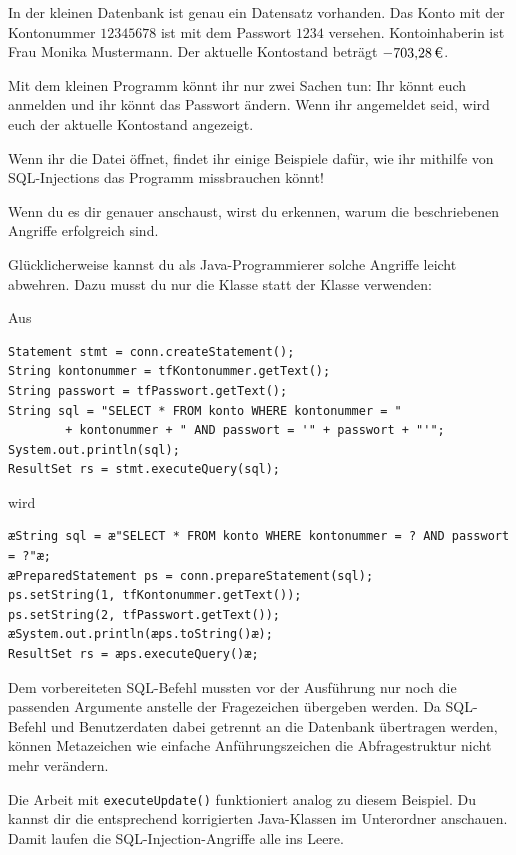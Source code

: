 In der kleinen Datenbank ist genau ein Datensatz vorhanden. Das Konto mit der
Kontonummer $12345678$ ist mit dem Passwort $1234$ versehen. Kontoinhaberin ist
Frau Monika Mustermann. Der aktuelle Kontostand beträgt $-703{,}28\,\mbox{\texteuro}$.

Mit dem kleinen Programm könnt ihr nur zwei Sachen tun: Ihr könnt euch anmelden
und ihr könnt das Passwort ändern. Wenn ihr angemeldet seid, wird euch der
aktuelle Kontostand angezeigt.

Wenn ihr die Datei  öffnet, findet ihr einige
Beispiele dafür, wie ihr mithilfe von SQL-Injections das Programm missbrauchen
könnt!

Wenn du es dir genauer anschaust, wirst du erkennen, warum die beschriebenen
Angriffe erfolgreich sind.

Glücklicherweise kannst du als Java-Programmierer solche Angriffe leicht
abwehren. Dazu musst du nur die Klasse  statt der
Klasse  verwenden:

Aus

\begin{lstlisting}
Statement stmt = conn.createStatement();
String kontonummer = tfKontonummer.getText();
String passwort = tfPasswort.getText();
String sql = "SELECT * FROM konto WHERE kontonummer = " 
        + kontonummer + " AND passwort = '" + passwort + "'";
System.out.println(sql);
ResultSet rs = stmt.executeQuery(sql);
\end{lstlisting}

wird

\begin{lstlisting}
æString sql = æ"SELECT * FROM konto WHERE kontonummer = ? AND passwort = ?"æ;
æPreparedStatement ps = conn.prepareStatement(sql); 
ps.setString(1, tfKontonummer.getText());
ps.setString(2, tfPasswort.getText());
æSystem.out.println(æps.toString()æ);
ResultSet rs = æps.executeQuery()æ;
\end{lstlisting}

Dem vorbereiteten SQL-Befehl mussten vor der Ausführung nur noch die passenden
Argumente anstelle der Fragezeichen übergeben werden. Da SQL-Befehl und
Benutzerdaten dabei getrennt an die Datenbank übertragen werden, können
Metazeichen wie einfache Anführungszeichen die Abfragestruktur nicht mehr
verändern.

Die Arbeit mit \lstinline|executeUpdate()| funktioniert analog zu diesem
Beispiel. Du kannst dir die entsprechend korrigierten Java-Klassen im
Unterordner  anschauen. Damit laufen die
SQL-Injection-Angriffe alle ins Leere.
